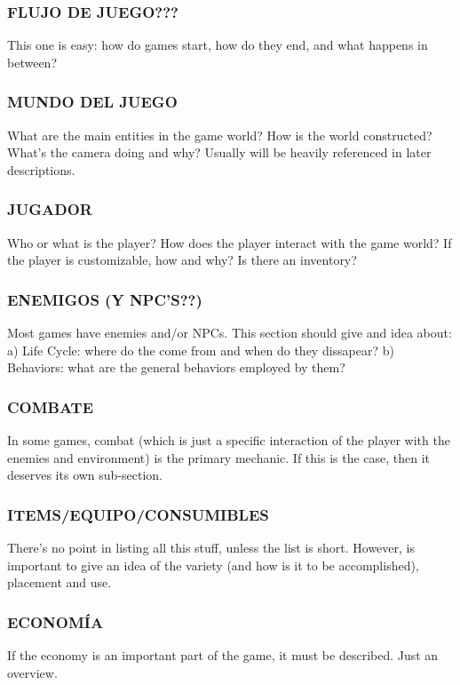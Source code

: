\documentclass{article}
\begin{document}
    \subsubsection{FLUJO DE JUEGO???} %
    This one is easy: how do games start, how do they end, and what happens in between?

    \subsubsection{MUNDO DEL JUEGO}
    What are the main entities in the game world? How is the world constructed? What’s the camera doing and why? Usually will be heavily referenced in later descriptions.

    \subsubsection{JUGADOR}
    Who or what is the player? How does the player interact with the game world? If the player is customizable, how and why? Is there an inventory?

    \subsubsection{ENEMIGOS (Y NPC'S??)}
    Most games have enemies and/or NPCs. This section should give and idea about:
    a) Life Cycle: where do the come from and when do they dissapear?
    b) Behaviors: what are the general behaviors employed by them?

    \subsubsection{COMBATE}
    In some games, combat (which is just a specific interaction of the player with the enemies and environment) is the primary mechanic. If this is the case, then it deserves its own sub-section.

    \subsubsection{ITEMS/EQUIPO/CONSUMIBLES}
    There’s no point in listing all this stuff, unless the list is short. However, is important to give an idea of the variety (and how is it to be accomplished), placement and use.

    \subsubsection{ECONOMÍA}
    If the economy is an important part of the game, it must be described. Just an overview.
\end{document}
